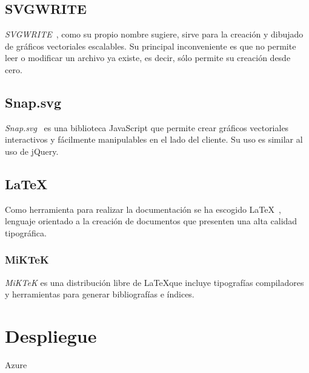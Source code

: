 \subsection{SVGWRITE}
\textit{SVGWRITE}~\cite{doc:svgwritedocs}, como su propio nombre sugiere, sirve para la creación y dibujado de gráficos vectoriales escalables. Su principal inconveniente es que no permite leer o modificar un archivo ya existe, es decir, sólo permite su creación desde cero.

\subsection{Snap.svg}
\textit{Snap.svg}~\cite{doc:snapsvg} es una biblioteca JavaScript que permite crear gráficos vectoriales interactivos y fácilmente manipulables en el lado del cliente. Su uso es similar al uso de jQuery.


\subsection{\LaTeX}
Como herramienta para realizar la documentación se ha escogido \LaTeX{}~\cite{wiki:latex}, lenguaje orientado a la creación de documentos que presenten una alta calidad tipográfica.

\subsubsection{MiKTeK}
\textit{MiKTeK} es una distribución libre de \LaTeX que incluye tipografías compiladores y herramientas para generar bibliografías e índices.


\section{Despliegue}
Azure

